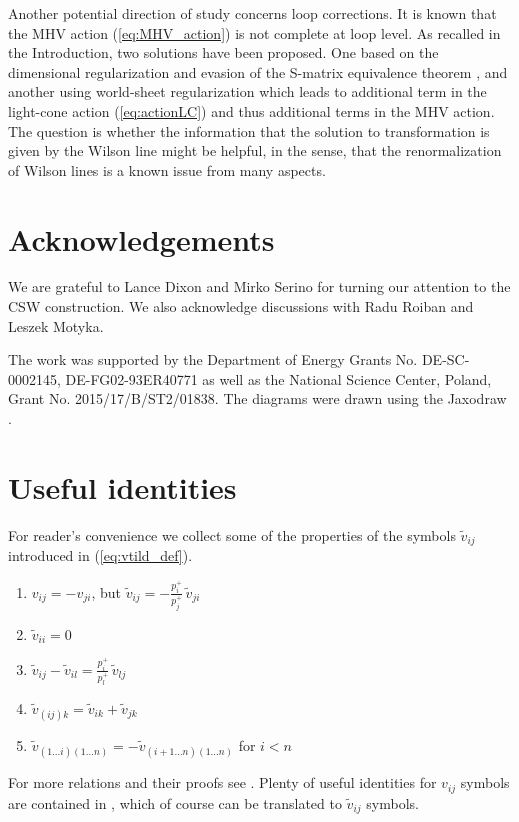\documentclass[english,american]{article}
\begin{document}
Another potential direction of study concerns loop corrections. It
is known that the MHV action (\ref{eq:MHV_action}) is not complete
at loop level. As recalled in the Introduction, two solutions have
been proposed. One based on the dimensional regularization and evasion
of the S-matrix equivalence theorem \citep{Ettle2007}, and another
using world-sheet regularization \citep{Brandhuber2007} which leads
to additional term in the light-cone action (\ref{eq:actionLC}) and
thus additional terms in the MHV action. The question is whether the
information that the solution to transformation is given by the Wilson
line might be helpful, in the sense, that the renormalization of Wilson
lines is a known issue from many aspects.


\section*{Acknowledgements}

We are grateful to Lance Dixon and Mirko Serino for turning our attention
to the CSW construction. We also acknowledge discussions with Radu Roiban
and Leszek Motyka.

The work was supported by the Department of Energy Grants No. DE-SC-0002145,
DE-FG02-93ER40771 as well as the National Science Center, Poland, Grant No. 2015/17/B/ST2/01838. The diagrams were drawn using the Jaxodraw \citep{Binosi:2003yf}.

\newpage 

\appendix 


\section{Useful identities}

\label{sec:App_ident}

For reader's convenience we collect some of the properties of the
symbols $\tilde{v}_{ij}$ introduced in (\ref{eq:vtild_def}).
\begin{enumerate}
\item $v_{ij}=-v_{ji}$, but $\tilde{v}_{ij}=-\frac{p_{i}^{+}}{p_{j}^{+}}\,\tilde{v}_{ji}$
\label{enu:vtild_prop_1}
\item $\tilde{v}_{ii}=0$ \label{enu:vtild_prop_2}
\item $\tilde{v}_{ij}-\tilde{v}_{il}=\frac{p_{i}^{+}}{p_{l}^{+}}\,\tilde{v}_{lj}$
\label{enu:vtild_prop_3}
\item $\tilde{v}_{\left(ij\right)k}=\tilde{v}_{ik}+\tilde{v}_{jk}$ \label{enu:vtild_prop_4}
\item $\tilde{v}_{\left(1\dots i\right)\left(1\dots n\right)}=-\tilde{v}_{\left(i+1\dots n\right)\left(1\dots n\right)}$
for $i<n$ \label{enu:vtild_prop_5}
\end{enumerate}
For more relations and their proofs see \citep{Cruz-Santiago2015}.
Plenty of useful identities for $v_{ij}$ symbols are contained in
\citep{Motyka2009,Cruz-Santiago2013}, which of course can be translated
to $\tilde{v}_{ij}$ symbols.
\end{document}
